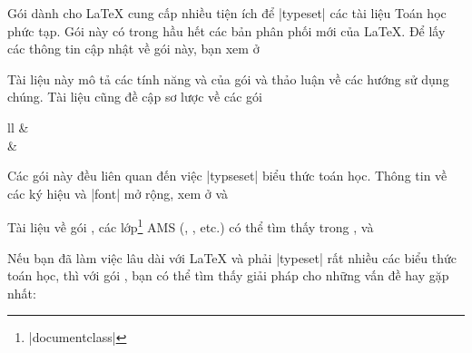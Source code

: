 Gói  dành cho \LaTeX{} cung cấp nhiều tiện ích để |typeset|
các tài liệu Toán học phức tạp. Gói này có trong hầu hết các bản phân phối
mới của \LaTeX{}. Để lấy các thông tin cập nhật về gói này, bạn xem ở

\medskip
{}
\medskip

Tài liệu này mô tả các tính năng và của gói  và thảo luận
về các hướng sử dụng chúng. Tài liệu cũng đề cập sơ lược về các gói
\begin{ctab}{ll}
& \\
& \\
\end{ctab}
Các gói này đều liên quan đến việc |typseset| biểu thức toán học.
Thông tin về các ký hiệu và |font| mở rộng, xem ở \cite{amsfonts} và

\medskip
{}
\medskip
\noindent
Tài liệu về gói , các lớp\footnote{|documentclass|} AMS (,
, etc.\@) có thể tìm thấy trong \cite{amsthdoc}, \cite{instr-l}
và 

\medskip
{}

\bigskip
Nếu bạn đã làm việc lâu dài với \LaTeX{} và phải |typeset| rất nhiều các biểu thức
toán học, thì với gói , bạn có thể tìm thấy giải pháp
cho những vấn đề hay gặp nhất:

